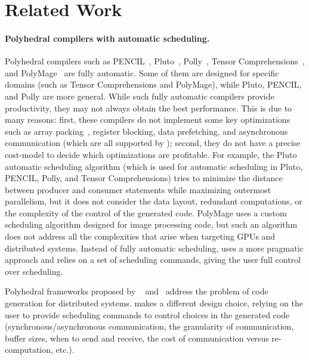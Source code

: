 \vspace*{-0.25cm}
\section{Related Work\label{related}}
\vspace*{-0.1cm}
\paragraph{Polyhedral compilers with automatic scheduling.}

Polyhedral compilers such as PENCIL~\cite{pencil,pencil_paper}, Pluto~\cite{bondhugula_practical_2008}, Polly~\cite{polly}, Tensor Comprehensions~\cite{Vasilache2018TensorCF}, and PolyMage~\cite{Mullapudi:2015:PAO:2786763.2694364} are fully automatic.  Some of them are designed for specific domains (such as Tensor Comprehensions and PolyMage), while Pluto, PENCIL, and Polly are more general.
While such fully automatic compilers provide productivity, they may not always obtain the best performance.  This is due to many reasons: first, these compilers do not implement some key optimizations such as array packing~\cite{Goto:2008:AHM:1356052.1356053}, register blocking, data prefetching, and asynchronous communication (which are all supported by \framework{}); second, they do not have a precise cost-model to decide which optimizations are profitable.  For example, the Pluto~\cite{bondhugula_practical_2008} automatic scheduling algorithm (which is used for automatic scheduling in Pluto, PENCIL, Polly, and Tensor Comprehensions) tries to minimize the distance between producer and consumer statements while maximizing outermost parallelism, but it does not consider the data layout, redundant computations, or the complexity of the control of the generated code.  PolyMage uses a custom scheduling algorithm designed for image processing code, but such an algorithm does not address all the complexities that arise when targeting GPUs and distributed systems.
Instead of fully automatic scheduling, \framework uses a more pragmatic approach and relies on a set of scheduling commands, giving the user full control over scheduling.


Polyhedral frameworks proposed by ~\citet{Amarasinghe:1993:COC:173262.155102} and~\citet{6877466} address the problem of code generation for distributed systems. \framework{} makes a different design choice, relying on the user to provide scheduling commands to control choices in the generated code (synchronous/asynchronous communication, the granularity of communication, buffer sizes, when to send and receive, the cost of communication versus re-computation, etc.).


